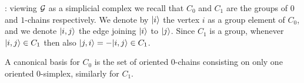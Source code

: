 \documentclass[../2.tex]{subfiles}
\begin{document}

    : viewing $\mathcal{G}$ as a simplicial complex we recall that $C_0$ and $C_1$ are the groups of $0$ and $1$-chains respectively. We denote by $| i \rangle$
    the vertex $i$ as a group element of $C_0$, and we denote $| i,j \rangle$ the edge joining $| i \rangle$ to $| j \rangle$.
    Since $C_1$ is a group, whenever $| i,j \rangle \in C_1$ then also $| j,i \rangle = -| i,j \rangle \in C_1$. 
    
    A canonical basis for $C_0$ is the set of oriented $0$-chains consisting on only one oriented $0$-simplex, 
    similarly for $C_1$.
\end{document}
